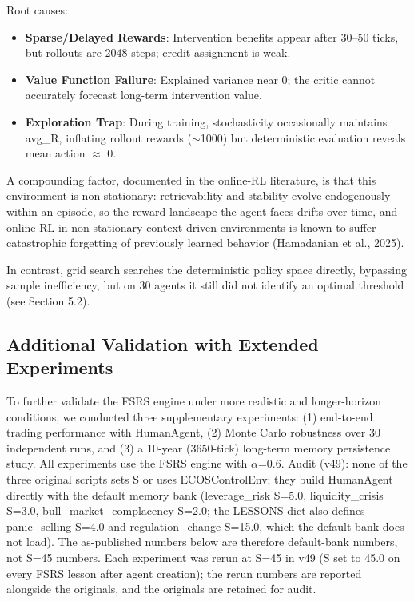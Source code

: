 \documentclass[11pt]{article}
\begin{document}
Root causes:

\begin{itemize}
\item \textbf{Sparse/Delayed Rewards}: Intervention benefits appear after 30--50 ticks, but rollouts are 2048 steps; credit assignment is weak.
\item \textbf{Value Function Failure}: Explained variance near 0; the critic cannot accurately forecast long-term intervention value.
\item \textbf{Exploration Trap}: During training, stochasticity occasionally maintains avg\_R, inflating rollout rewards ($\sim$1000) but deterministic evaluation reveals mean action $\approx$ 0.
\end{itemize}

A compounding factor, documented in the online-RL literature, is that this environment is non-stationary: retrievability and stability evolve endogenously within an episode, so the reward landscape the agent faces drifts over time, and online RL in non-stationary context-driven environments is known to suffer catastrophic forgetting of previously learned behavior (Hamadanian et al., 2025).

In contrast, grid search searches the deterministic policy space directly, bypassing sample inefficiency, but on 30 agents it still did not identify an optimal threshold (see Section 5.2).

\subsection{Additional Validation with Extended Experiments}
To further validate the FSRS engine under more realistic and longer-horizon conditions, we conducted three supplementary experiments: (1) end-to-end trading performance with HumanAgent, (2) Monte Carlo robustness over 30 independent runs, and (3) a 10-year (3650-tick) long-term memory persistence study. All experiments use the FSRS engine with $\alpha$=0.6. Audit (v49): none of the three original scripts sets S or uses ECOSControlEnv; they build HumanAgent directly with the default memory bank (leverage\_risk S=5.0, liquidity\_crisis S=3.0, bull\_market\_complacency S=2.0; the LESSONS dict also defines panic\_selling S=4.0 and regulation\_change S=15.0, which the default bank does not load). The as-published numbers below are therefore default-bank numbers, not S=45 numbers. Each experiment was rerun at S=45 in v49 (S set to 45.0 on every FSRS lesson after agent creation); the rerun numbers are reported alongside the originals, and the originals are retained for audit.
\end{document}

